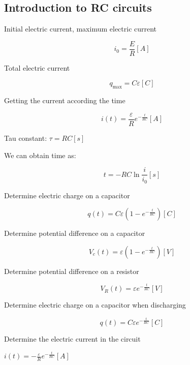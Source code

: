 \documentclass[letterpaper]{article}
\begin{document}
    \begin{multicols}{2}
        \section{Introduction to RC circuits}

        Initial electric current, maximum electric current

        \[i_0 = \frac{E}{R}[A]\]

        Total electric current

        \[q_{\text{max}} = C \varepsilon [C]\]

        Getting the current according the time

        \[i(t) = \frac{\varepsilon}{R} e^{- \frac{t}{RC}} [A]\]

        Tau constant: \(\tau = RC [s]\)

        We can obtain time as:

        \[t = -RC \ln{\frac{i}{i_0}} [s]\]

        Determine electric charge on a capacitor

        \[q(t) = C \varepsilon ( 1 - e^{- \frac{t}{RC}} )[C]\]

        Determine potential difference on a capacitor

        \[V_c (t) = \varepsilon (1 - e^{- \frac{t}{RC}}) [V]\]

        Determine potential difference on a resistor

        \[V_R (t) = \varepsilon e^{- \frac{t}{RC}} [V]\]

        Determine electric charge on a capacitor when discharging

        \[q(t) = C \varepsilon e^{- \frac{t}{RC}} [C]\]

        Determine the electric current in the circuit

        \(i(t) = - \frac{\varepsilon}{R} e^{- \frac{t}{RC}} [A]\)
        
    \end{multicols}
    
\end{document}
